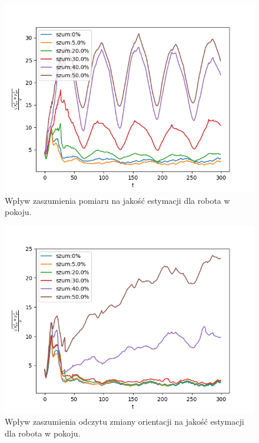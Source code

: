 \begin{figure}[H]
	\begin{center}
		\includegraphics[width=12cm]{./wplyw_szumu.png}
		\caption{Wpływ zaszumienia pomiaru na jakość estymacji dla robota w pokoju.}
		\label{wplyw_szumu}
	\end{center}
\end{figure}
\begin{figure}[H]
\begin{center}
	\includegraphics[width=12cm]{./wplyw_szumu_ori.png}
	\caption{Wpływ zaszumienia odczytu zmiany orientacji na jakość estymacji dla robota w pokoju.}
	\label{wplyw_szumu_ori}
\end{center}
\end{figure}

